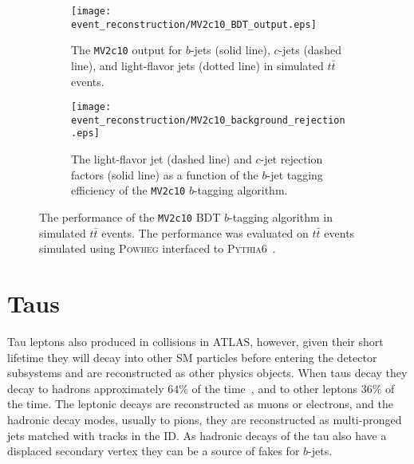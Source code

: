 \begin{figure}[htbp]
 \centering
 \begin{subfigure}[t]{0.48\textwidth}
  \centering
  \texttt{[image: event\_reconstruction/MV2c10\_BDT\_output.eps]}
  \caption[The \texttt{MV2c10} output for $b$-jets, $c$-jets, and light-flavor jets in simulated $t\bar{t}$ events.]{%
   The \texttt{MV2c10} output for $b$-jets (solid line), $c$-jets (dashed line), and light-flavor jets (dotted line) in simulated $t\bar{t}$ events.}
  \label{fig:MV2c10_BDT_output}
 \end{subfigure}%
 \quad
 \begin{subfigure}[t]{0.48\textwidth}
  \centering
  \texttt{[image: event\_reconstruction/MV2c10\_background\_rejection.eps]}
  \caption[The light-flavor jet and $c$-jet rejection factors as a function of the $b$-jet tagging efficiency of the \texttt{MV2c10} $b$-tagging algorithm.]{%
   The light-flavor jet (dashed line) and $c$-jet rejection factors (solid line) as a function of the $b$-jet tagging efficiency of the \texttt{MV2c10} $b$-tagging algorithm.}
  \label{fig:MV2c10_background_rejection}
 \end{subfigure}%
 \caption[The performance of the \texttt{MV2c10} BDT $b$-tagging algorithm in simulated $t\bar{t}$ events.]{%
  The performance of the \texttt{MV2c10} BDT $b$-tagging algorithm in simulated $t\bar{t}$ events.
  The performance was evaluated on $t\bar{t}$ events simulated using \textsc{Powheg} interfaced to \textsc{Pythia6}~\cite{PERF-2016-05}.}
 \label{fig:MV2c10_BDT}
\end{figure}

\clearpage
\section{Taus}\label{section:taus}

Tau leptons also produced in collisions in ATLAS, however, given their short lifetime they will decay into other SM particles before entering the detector subsystems and are reconstructed as other physics objects.
When taus decay they decay to hadrons approximately $64\%$ of the time~\cite{Gallinaro:2014eha}, and to other leptons $36\%$ of the time.
The leptonic decays are reconstructed as muons or electrons, and the hadronic decay modes, usually to pions, they are reconstructed as multi-pronged jets matched with tracks in the ID.
As hadronic decays of the tau also have a displaced secondary vertex they can be a source of fakes for $b$-jets.

